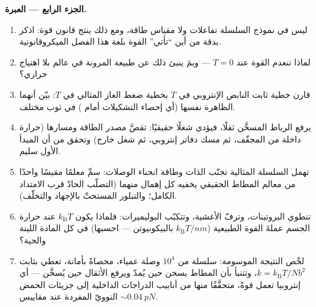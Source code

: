 \begin{problem}
\medskip\noindent\textbf{الجزء الرابع --- العبرة.}
\begin{enumerate}[resume]
  \item ليس في نموذج السلسلة تفاعلات ولا مقياس طاقة،
        ومع ذلك ينتج قانون قوة: اذكر بدقة من أين ``تأتي'' القوة
        بلغة هذا الفصل الميكروقانونية.
  \item لماذا تنعدم القوة عند $T = 0$ --- وبمَ ينبئ
        ذلك عن طبيعة المرونة في عالم بلا
        اهتياج حراري؟
  \item قارن خطية ثابت النابض الإنتروبي في $T$ بخطية
        ضغط الغاز المثالي في $T$: بيّن أنهما الظاهرة
        نفسها (أي إحصاء التشكيلات أمام
        ) في ثوب مختلف.
  \item يرفع الرباط المسخَّن ثقلًا، فيؤدي شغلًا حقيقيًا: تقصَّ
        مصدر الطاقة ومسارها (حرارة داخلة من المجفّف، ثم
        مسك دفاتر إنتروبي، ثم شغل خارج) وتحقق من أن المبدأ الأول
        سليم.
  \item تهمل السلسلة المثالية تجنّب الذات وطاقة انحناء الوصلات:
        سمِّ معلمًا مقيسًا واحدًا من معالم المطاط الحقيقي يخفيه
        كل إهمال منهما (التصلّب الحادّ قرب الامتداد الكامل؛
        والتبلور المستحثّ بالإجهاد والتخلّف).
  \item تنطوي البروتينات، وترفّ الأغشية، وتتكبّب البوليميرات: فلماذا يكون
        $k_{\text{B}}T$ عند حرارة الجسم عملةَ القوة
        الطبيعية ($k_{\text{B}}T/\unit{nm}$ بالبيكونيوتن ---
        احسبها) في كل المادة اللينة والحية؟
  \item لخّص النتيجة الموسومة: سلسلة من $10^4$ وصلة عمياء،
        محصاةً بأمانة، تعطي  بثابت $k =
        k_{\text{B}}T/Nb^2$، وتتنبأ بأن المطاط يسخن حين
        يُمدّ ويرفع الأثقال حين يُسخَّن --- أي إنتروبيا تعمل
        قوةً، متحقَّقًا منها من أنابيب الدراجات الداخلية إلى جزيئات
        الحمض النوويّ المفردة عند مقاييس $\sim\qty{0.04}{pN}$.
\end{enumerate}
\end{problem}
